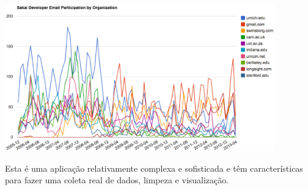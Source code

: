 \beforefig
\centerline{\includegraphics[height=2.50in]{figs2/mailorg.eps}}
\afterfig

Esta é uma aplicação relativamente complexa e sofisticada e têm características
para fazer uma coleta real de dados, limpeza e visualização. 
